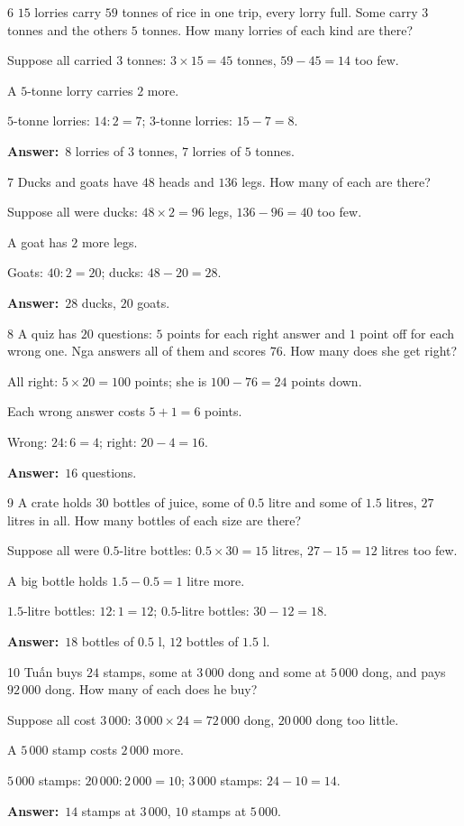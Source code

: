 \documentclass[11pt]{article}
\newif\ifsol \solfalse
\providecommand{\AnsWord}{Đáp số}
\newcommand{\dapso}[1]{\par\textbf{\AnsWord:}\ #1}
\newcommand{\probsol}[1]{%
  \begin{lrbox}{\solmeasure}\begin{minipage}{\dimexpr\linewidth-24pt\relax}#1\end{minipage}\end{lrbox}%
  \ifsol
    \begin{solbox}#1\end{solbox}%
  \else
    \setlength{\solht}{\dimexpr\ht\solmeasure+\dp\solmeasure+0.85cm\relax}%
    \ifdim\solht<1.35cm\setlength{\solht}{1.35cm}\fi
    \begin{tcolorbox}[colback=white,colframe=Line,boxrule=0.8pt,arc=5pt,
      left=8pt,right=8pt,top=4pt,bottom=4pt,height=\solht]{\footnotesize\color{Slate}\itshape\WorkWord}\end{tcolorbox}%
  \fi}
\newcommand{\gap}{\vspace{0.3cm}}
\def\WorkWord{Your work:}
\def\AnsWord{Answer}
\begin{document}
\gap
\begin{probbox}{6}{\relax}
$15$ lorries carry $59$ tonnes of rice in one trip, every lorry full. Some carry $3$ tonnes and the others $5$ tonnes. How many lorries of each kind are there?
\end{probbox}
\probsol{
Suppose all carried $3$ tonnes: $3\times15=45$ tonnes, $59-45=14$ too few.\par
A $5$-tonne lorry carries $2$ more.\par $5$-tonne lorries: $14:2=7$; $3$-tonne lorries: $15-7=8$.
\dapso{$8$ lorries of $3$ tonnes, $7$ lorries of $5$ tonnes.}}
\gap
\begin{probbox}{7}{\relax}
Ducks and goats have $48$ heads and $136$ legs. How many of each are there?
\end{probbox}
\probsol{
Suppose all were ducks: $48\times2=96$ legs, $136-96=40$ too few.\par
A goat has $2$ more legs.\par Goats: $40:2=20$; ducks: $48-20=28$.
\dapso{$28$ ducks, $20$ goats.}}
\gap
\begin{probbox}{8}{\relax}
A quiz has $20$ questions: $5$ points for each right answer and $1$ point off for each wrong one. Nga answers all of them and scores $76$. How many does she get right?
\end{probbox}
\probsol{
All right: $5\times20=100$ points; she is $100-76=24$ points down.\par
Each wrong answer costs $5+1=6$ points.\par Wrong: $24:6=4$; right: $20-4=16$.
\dapso{$16$ questions.}}
\gap
\begin{probbox}{9}{\relax}
A crate holds $30$ bottles of juice, some of $0.5$ litre and some of $1.5$ litres, $27$ litres in all. How many bottles of each size are there?
\end{probbox}
\probsol{
Suppose all were $0.5$-litre bottles: $0.5\times30=15$ litres, $27-15=12$ litres too few.\par
A big bottle holds $1.5-0.5=1$ litre more.\par
$1.5$-litre bottles: $12:1=12$; $0.5$-litre bottles: $30-12=18$.
\dapso{$18$ bottles of $0.5$ l, $12$ bottles of $1.5$ l.}}
\gap
\begin{probbox}{10}{\relax}
Tuấn buys $24$ stamps, some at $3\,000$ dong and some at $5\,000$ dong, and pays $92\,000$ dong. How many of each does he buy?
\end{probbox}
\probsol{
Suppose all cost $3\,000$: $3\,000\times24=72\,000$ dong, $20\,000$ dong too little.\par
A $5\,000$ stamp costs $2\,000$ more.\par $5\,000$ stamps: $20\,000:2\,000=10$; $3\,000$ stamps: $24-10=14$.
\dapso{$14$ stamps at $3\,000$, $10$ stamps at $5\,000$.}}
\end{document}
